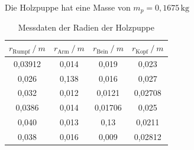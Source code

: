 \begin{flushleft}
    Die Holzpuppe hat eine Masse von $ m_{p} = 0,1675\, \unit{\kilogram} $
\end{flushleft}

\begin{table}
    \centering
    \caption{Messdaten der Radien der Holzpuppe}
    \label{Tabelle5}
    \begin{tabular} {c  c  c  c}
        \toprule
        {$r_{\text{Rumpf}} \mathbin{/} \unit{m}$} &
        {$r_{\text{Arm}}   \mathbin{/} \unit{m}$} &
        {$r_{\text{Bein}}  \mathbin{/} \unit{m}$} &
        {$r_{\text{Kopf}}  \mathbin{/} \unit{m}$} \\
        \midrule
        \vspace{0.2cm}
        0,03912& 0,014 & 0,019   & 0,023    \\
        \vspace{0.2cm}
        0,026  & 0,138 & 0,016   & 0,027    \\
        \vspace{0.2cm}
        0,032  & 0,012 & 0,0121  & 0,02708  \\
        \vspace{0.2cm}
        0,0386 & 0,014 & 0,01706 & 0,025    \\
        \vspace{0.2cm}
        0,040  & 0,013 & 0,13    & 0,0211   \\
        \vspace{0.2cm}
        0,038  & 0,016 & 0,009   & 0,02812  \\
        \bottomrule
    \end{tabular} 
\end{table}

\newpage 

